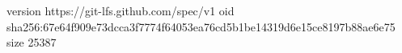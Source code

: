 version https://git-lfs.github.com/spec/v1
oid sha256:67e64f909e73dcca3f7774f64053ea76cd5b1be14319d6e15ce8197b88ae6e75
size 25387
